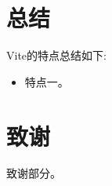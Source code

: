 \documentclass[UTF8,nofonts]{ctexart}
\begin{document}
\begin{multicols}{2}
\section{总结}

Vite的特点总结如下:

\begin{itemize}
	\item 特点一。
\end{itemize}

\section{致谢}
致谢部分。

\end{multicols}



\end{document}
